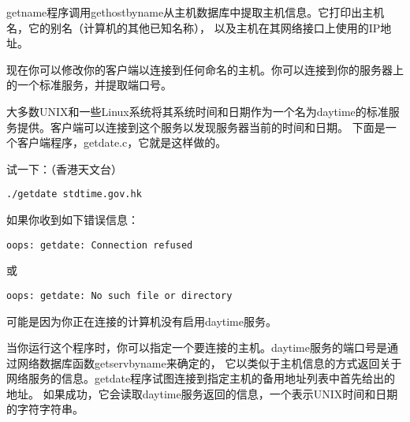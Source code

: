\documentclass{ctexart}
\begin{document}
getname程序调用gethostbyname从主机数据库中提取主机信息。它打印出主机名，它的别名（计算机的其他已知名称），
以及主机在其网络接口上使用的IP地址。

现在你可以修改你的客户端以连接到任何命名的主机。你可以连接到你的服务器上的一个标准服务，并提取端口号。  
  
大多数UNIX和一些Linux系统将其系统时间和日期作为一个名为daytime的标准服务提供。客户端可以连接到这个服务以发现服务器当前的时间和日期。
下面是一个客户端程序，getdate.c，它就是这样做的。  

试一下：（香港天文台）
\begin{verbatim}
./getdate stdtime.gov.hk
\end{verbatim}

如果你收到如下错误信息：  
\begin{verbatim}  
oops: getdate: Connection refused  
\end{verbatim}  
或  
\begin{verbatim}  
oops: getdate: No such file or directory  
\end{verbatim}  
可能是因为你正在连接的计算机没有启用daytime服务。

当你运行这个程序时，你可以指定一个要连接的主机。daytime服务的端口号是通过网络数据库函数getservbyname来确定的，
它以类似于主机信息的方式返回关于网络服务的信息。getdate程序试图连接到指定主机的备用地址列表中首先给出的地址。
如果成功，它会读取daytime服务返回的信息，一个表示UNIX时间和日期的字符字符串。  
\end{document}
